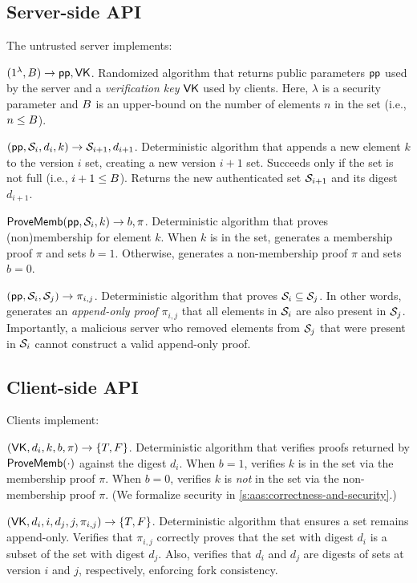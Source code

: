 \subsection{Server-side API}
The untrusted server implements:
\vspace{1em}

\api {\setup}$(1^\lambda, B) \rightarrow \mathsf{pp}, \mathsf{VK}$.
Randomized algorithm that returns public parameters $\mathsf{pp}$ used by the server and a \textit{verification key} $\mathsf{VK}$ used by clients.
Here, $\lambda$ is a security parameter and $B$ is an upper-bound on the number of elements $n$ in the set (i.e., $n \le B$).

\api {\append}$(\mathsf{pp}, \mathcal{S}_i, d_i, k) \rightarrow \mathcal{S}_{i+1}, d_{i+1}$.
Deterministic algorithm that appends a new element $k$ to the version $i$ set, creating a new version $i+1$ set.
Succeeds only if the set is not full (i.e., $i + 1 \le B$).
Returns the new authenticated set $\mathcal{S}_{i+1}$ and its digest $d_{i+1}$.

\api $\mathsf{ProveMemb}(\mathsf{pp}, \mathcal{S}_i, k) \rightarrow b, \pi$.
Deterministic algorithm that proves (non)membership for element $k$.
When $k$ is in the set, generates a membership proof $\pi$ and sets $b=1$.
Otherwise, generates a non-membership proof $\pi$ and sets $b=0$.

\api {\proveappendonly}$(\mathsf{pp}, \mathcal{S}_i, \mathcal{S}_j) \rightarrow \pi_{i, j}$.
Deterministic algorithm that proves $\mathcal{S}_i \subseteq \mathcal{S}_j$.
In other words, generates an \textit{append-only proof} $\pi_{i, j}$ that all elements in $\mathcal{S}_i$ are also present in $\mathcal{S}_j$.
Importantly, a malicious server who removed elements from $\mathcal{S}_j$ that were present in $\mathcal{S}_i$ cannot construct a valid append-only proof.

\subsection{Client-side API}
Clients implement:
\vspace{1em}

\api {\vermemb}$(\mathsf{VK}, d_i, k, b, \pi) \rightarrow \{T, F\}$.
Deterministic algorithm that verifies proofs returned by $\mathsf{ProveMemb}(\cdot)$ against the digest $d_i$.
When $b=1$, verifies $k$ is in the set via the membership proof $\pi$.
When $b=0$, verifies $k$ is \textit{not} in the set via the non-membership proof $\pi$.
(We formalize security in \cref{s:aas:correctness-and-security}.)

\api {\verappendonly}$(\mathsf{VK}, d_i, i, d_j, j, \pi_{i,j}) \rightarrow \{T, F\}$.
Deterministic algorithm that ensures a set remains append-only.
Verifies that $\pi_{i,j}$ correctly proves that the set with digest $d_i$ is a subset of the set with digest $d_j$.
Also, verifies that $d_i$ and $d_j$ are digests of sets at version $i$ and $j$, respectively, enforcing fork consistency.

